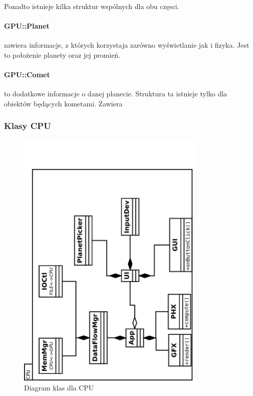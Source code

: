 \paragraph{}
Ponadto istnieje kilka struktur wspólnych dla obu częsci.

\paragraph{GPU::Planet} zawiera informacje, z których korzystaja zarówno wyświetlanie jak i fizyka. Jest to położenie planety oraz jej promień.
\paragraph{GPU::Comet} to dodatkowe informacje o danej planecie. Struktura ta istnieje tylko dla obiektów będących kometami. Zawiera 

\subsubsection{Klasy CPU}

\begin{figure}[h]
	\centering
	\includegraphics[angle=270,width=0.8\textwidth]{class_cpu.pdf}
	\caption{Diagram klas dla CPU}
	\label{fig:class_cpu}
\end{figure}

